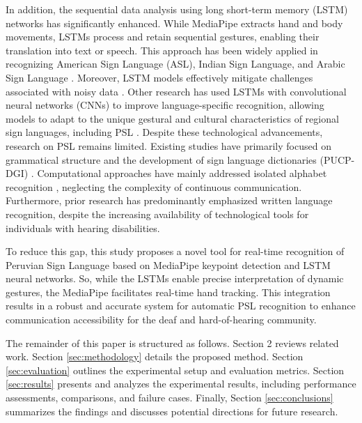 \documentclass[preprint,12pt,authoryear]{elsarticle}
\begin{document}
In addition, the sequential data analysis using long short-term memory (LSTM) networks has significantly enhanced. While MediaPipe extracts hand and body movements, LSTMs process and retain sequential gestures, enabling their translation into text or speech. This approach has been widely applied in recognizing American Sign Language (ASL), Indian Sign Language, and Arabic Sign Language \cite{Kumari24, Mali23}. Moreover, LSTM models effectively mitigate challenges associated with noisy data \cite{Mali23}.  Other research has used LSTMs with convolutional neural networks (CNNs) to improve language-specific recognition, allowing models to adapt to the unique gestural and cultural characteristics of regional sign languages, including PSL \cite{Kumari24}.
Despite these technological advancements, research on PSL remains limited. Existing studies have primarily focused on grammatical structure \cite{madrid18} and the development of sign language dictionaries (PUCP-DGI) \cite{rodriguez15}. Computational approaches have mainly addressed isolated alphabet recognition \cite{lazo19, mejia20, berru18, nurena20}, neglecting the complexity of continuous communication. Furthermore, prior research has predominantly emphasized written language recognition, despite the increasing availability of technological tools for individuals with hearing disabilities.

To reduce this gap, this study proposes a novel tool for real-time recognition of Peruvian Sign Language based on MediaPipe keypoint detection and LSTM
neural networks. So, while the LSTMs enable precise interpretation of dynamic gestures, the MediaPipe facilitates real-time hand tracking. This integration results in a robust and accurate system for automatic PSL recognition to enhance communication accessibility for the deaf and hard-of-hearing community.

The remainder of this paper is structured as follows. Section 2 reviews related work. Section \ref{sec:methodology} details the proposed method. Section \ref{sec:evaluation} outlines the experimental setup and evaluation metrics. Section \ref{sec:results} presents and analyzes the experimental results, including performance assessments, comparisons, and failure cases. Finally, Section \ref{sec:conclusions} summarizes the findings and discusses potential directions for future research.


\end{document}
